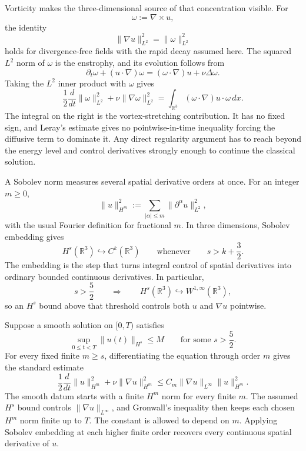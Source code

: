 Vorticity makes the three-dimensional source of that concentration visible.
For
\[
  \omega:=\nabla\times u,
\]
the identity
\[
  \lVert\nabla u\rVert_{L^2}^{2}
  =
  \lVert\omega\rVert_{L^2}^{2}
\]
holds for divergence-free fields with the rapid decay assumed here.
The squared \(L^2\) norm of \(\omega\) is the enstrophy, and its evolution follows from
\[
  \partial_t\omega+(u\cdot\nabla)\omega
  =
  (\omega\cdot\nabla)u+\nu\Delta\omega.
\]
Taking the \(L^2\) inner product with \(\omega\) gives
\[
  \frac12\frac{d}{dt}\lVert\omega\rVert_{L^2}^{2}
  +
  \nu\lVert\nabla\omega\rVert_{L^2}^{2}
  =
  \int_{\mathbb R^3}(\omega\cdot\nabla)u\cdot\omega\,dx.
\]
The integral on the right is the vortex-stretching contribution.
It has no fixed sign, and Leray's estimate gives no pointwise-in-time inequality forcing the diffusive term to dominate it.
Any direct regularity argument has to reach beyond the energy level and control derivatives strongly enough to continue the classical solution.


A Sobolev norm measures several spatial derivative orders at once.
For an integer \(m\geq0\),
\[
  \lVert u\rVert_{H^m}^{2}
  :=
  \sum_{|\alpha|\leq m}
  \lVert\partial^\alpha u\rVert_{L^2}^{2},
\]
with the usual Fourier definition for fractional \(m\).
In three dimensions, Sobolev embedding gives \parencite[Theorem~7.28]{Cerda2010}
\[
  H^s(\mathbb R^3)\hookrightarrow C^k(\mathbb R^3)
  \qquad
  \text{whenever}
  \qquad
  s>k+\frac32.
\]
The embedding is the step that turns integral control of spatial derivatives into ordinary bounded continuous derivatives.
In particular,
\[
  s>\frac52
  \qquad\Longrightarrow\qquad
  H^s(\mathbb R^3)\hookrightarrow W^{1,\infty}(\mathbb R^3),
\]
so an \(H^s\) bound above that threshold controls both \(u\) and \(\nabla u\) pointwise.

Suppose a smooth solution on \([0,T)\) satisfies
\[
  \sup_{0\leq t<T}\lVert u(t)\rVert_{H^s}
  \leq M
  \qquad
  \text{for some }s>\frac52.
\]
For every fixed finite \(m\geq s\), differentiating the equation through order \(m\) gives the standard estimate
\[
  \frac12\frac{d}{dt}\lVert u\rVert_{H^m}^{2}
  +
  \nu\lVert\nabla u\rVert_{H^m}^{2}
  \leq
  C_m\lVert\nabla u\rVert_{L^\infty}
  \lVert u\rVert_{H^m}^{2}.
\]
The smooth datum starts with a finite \(H^m\) norm for every finite \(m\).
The assumed \(H^s\) bound controls \(\lVert\nabla u\rVert_{L^\infty}\), and Gronwall's inequality then keeps each chosen \(H^m\) norm finite up to \(T\).
The constant is allowed to depend on \(m\).
Applying Sobolev embedding at each higher finite order recovers every continuous spatial derivative of \(u\).

